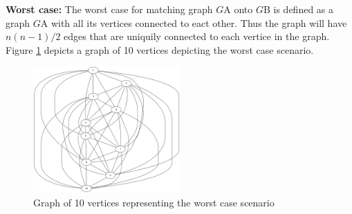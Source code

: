 \textbf{Worst case:} The worst case for matching graph $G${\tiny A} onto $G${\tiny B} is defined as a graph $G${\tiny A} with all its vertices connected
to eact other. Thus the graph will have $n(n − 1)/2$ edges that are uniquily connected to each vertice in the graph. Figure \ref{fig:worst_case} depicts
a graph of 10 vertices depicting the worst case scenario.

\begin{figure}[H]
  \begin{center}
      \includegraphics[width=0.5\textwidth]{worst.png}
  \end{center}    
  \caption{Graph of 10 vertices representing the worst case scenario}
  \label{fig:worst_case}
\end{figure}